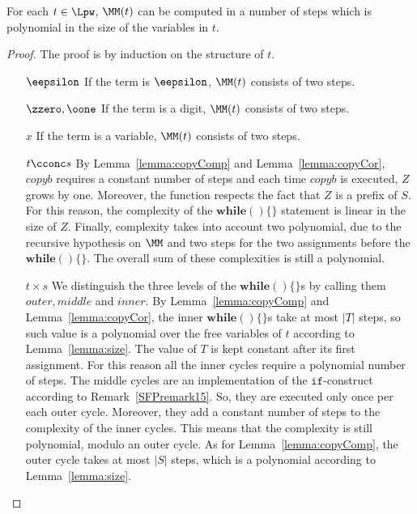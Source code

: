\begin{lemma}[Complexity of $\MM$]\label{lemma:compM}
For each $t\in \Lpw$,
$\MM(t)$ can be computed in a number
of steps which is polynomial in the size of
the variables in $t$.
\end{lemma}

\begin{proof}
The proof is by induction on the
structure of $t$.
\begin{itemize}
\item[$\eepsilon$] If the term is {$\eepsilon$},
$\MM(t)$ consists of two steps.
%
\item[$\zzero,\oone$] If the term is a digit, $\MM(t)$
consists of two steps.
%
\item[$x$] If the term is a variable,
$\MM(t)$ consists of two steps.
%
\item[$t\cconc s$] By Lemma~\ref{lemma:copyComp} and
Lemma~\ref{lemma:copyCor},
$copyb$ requires a constant number of steps
and each time $copyb$ is executed, $Z$ grows by one.
Moreover, the function {respects} the fact that
$Z$ is a prefix of $S$.
For this reason, the complexity of the
$\mathbf{while}()\{\}$ statement is linear in the size
of $Z$.
Finally, complexity takes into account
two polynomial, due to the recursive hypothesis
on $\MM$ and two steps for
the two assignments before the $\mathbf{while}()\{\}$.
The overall sum of these complexities is still
a polynomial.
%
\item[$t\times s$] We distinguish the three levels
of the $\mathbf{while}()\{\}$s by calling
them $outer, middle$ and $inner$.
By Lemma~\ref{lemma:copyComp}
and Lemma~\ref{lemma:copyCor},
the inner $\mathbf{while}()\{\}$s
take at most $|T|$ {steps, so} such
value is a polynomial over the free
variables of $t$
according to Lemma~\ref{lemma:size}.
The value of $T$ is kept constant
after its first assignment.
For this reason all the inner cycles
require a polynomial number
of steps.
The middle cycles are an implementation
of the $\mathtt{if}$-construct according to
Remark~\ref{SFPremark15}.
So, they are executed only once per each outer cycle.
Moreover, they add a constant number of steps
to the complexity of the inner cycles.
This means that the complexity is still polynomial,
modulo an outer cycle.
As for Lemma~\ref{lemma:copyComp},
the outer cycle takes at most $|S|$ steps, which is a polynomial
according to Lemma~\ref{lemma:size}.
\end{itemize}
\end{proof}







